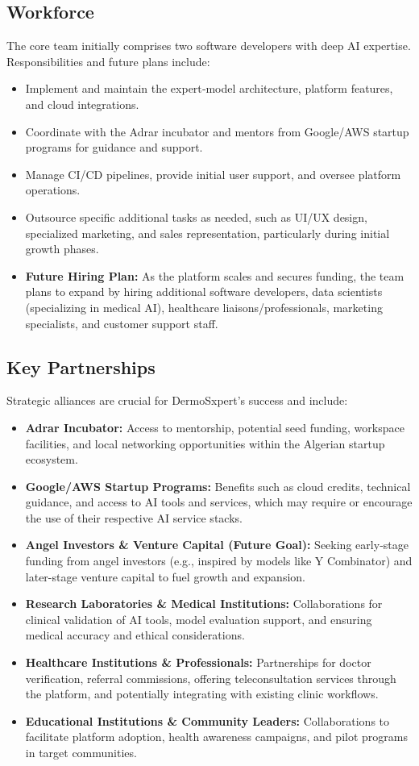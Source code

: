 \subsection{Workforce}
The core team initially comprises two software developers with deep AI expertise. Responsibilities and future plans include:
\begin{itemize}
  \item Implement and maintain the expert‐model architecture, platform features, and cloud integrations.
  \item Coordinate with the Adrar incubator and mentors from Google/AWS startup programs for guidance and support.
  \item Manage CI/CD pipelines, provide initial user support, and oversee platform operations.
  \item Outsource specific additional tasks as needed, such as UI/UX design, specialized marketing, and sales representation, particularly during initial growth phases.
  \item \textbf{Future Hiring Plan:} As the platform scales and secures funding, the team plans to expand by hiring additional software developers, data scientists (specializing in medical AI), healthcare liaisons/professionals, marketing specialists, and customer support staff.
\end{itemize}

\subsection{Key Partnerships}
Strategic alliances are crucial for DermoSxpert's success and include:
\begin{itemize}
  \item \textbf{Adrar Incubator:} Access to mentorship, potential seed funding, workspace facilities, and local networking opportunities within the Algerian startup ecosystem.
  \item \textbf{Google/AWS Startup Programs:} Benefits such as cloud credits, technical guidance, and access to AI tools and services, which may require or encourage the use of their respective AI service stacks.
  \item \textbf{Angel Investors \& Venture Capital (Future Goal):} Seeking early‐stage funding from angel investors (e.g., inspired by models like Y Combinator) and later-stage venture capital to fuel growth and expansion.
  \item \textbf{Research Laboratories \& Medical Institutions:} Collaborations for clinical validation of AI tools, model evaluation support, and ensuring medical accuracy and ethical considerations.
  \item \textbf{Healthcare Institutions \& Professionals:} Partnerships for doctor verification, referral commissions, offering teleconsultation services through the platform, and potentially integrating with existing clinic workflows.
  \item \textbf{Educational Institutions \& Community Leaders:} Collaborations to facilitate platform adoption, health awareness campaigns, and pilot programs in target communities.
\end{itemize}


